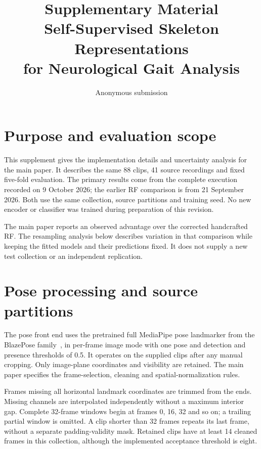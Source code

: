\documentclass[10pt,twocolumn,letterpaper]{article}
\title{Supplementary Material\\Self-Supervised Skeleton Representations\\for Neurological Gait Analysis}
\author{Anonymous submission}
\begin{document}
\maketitle
\setcounter{section}{0}
\renewcommand{\thesection}{S\arabic{section}}
\renewcommand{\thetable}{S\arabic{table}}
\renewcommand{\thefigure}{S\arabic{figure}}
\renewcommand{\theequation}{S\arabic{equation}}

\section{Purpose and evaluation scope}
This supplement gives the implementation details and uncertainty analysis for the main paper. It describes the same 88 clips, 41 source recordings and fixed five-fold evaluation. The primary results come from the complete execution recorded on 9 October 2026; the earlier RF comparison is from 21 September 2026. Both use the same collection, source partitions and training seed. No new encoder or classifier was trained during preparation of this revision.

The main paper reports an observed advantage over the corrected handcrafted RF. The resampling analysis below describes variation in that comparison while keeping the fitted models and their predictions fixed. It does not supply a new test collection or an independent replication.

\section{Pose processing and source partitions}
The pose front end uses the pretrained full MediaPipe pose landmarker from the BlazePose family~\cite{blazepose}, in per-frame image mode with one pose and detection and presence thresholds of 0.5. It operates on the supplied clips after any manual cropping. Only image-plane coordinates and visibility are retained. The main paper specifies the frame-selection, cleaning and spatial-normalization rules.

Frames missing all horizontal landmark coordinates are trimmed from the ends. Missing channels are interpolated independently without a maximum interior gap. Complete 32-frame windows begin at frames 0, 16, 32 and so on; a trailing partial window is omitted. A clip shorter than 32 frames repeats its last frame, without a separate padding-validity mask. Retained clips have at least 14 cleaned frames in this collection, although the implemented acceptance threshold is eight.
\end{document}
